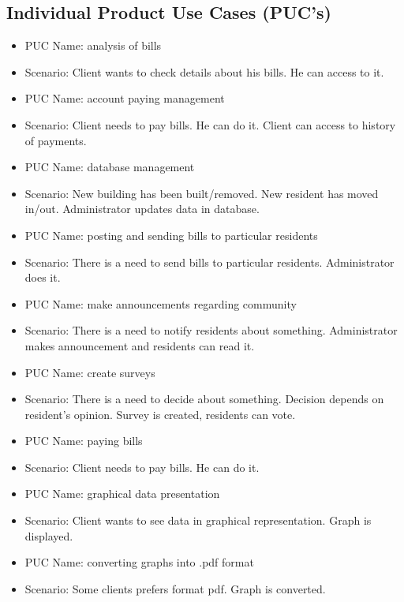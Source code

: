 \documentclass[a4paper,11pt,onecolumn,oneside]{book}
\begin{document}
\subsection{Individual Product Use Cases (PUC’s)}

\begin{itemize}
\item PUC Name: analysis of bills
\item Scenario: Client wants to check details about his bills. He can access to it.


\item PUC Name: account paying management
\item Scenario: Client needs to pay bills. He can do it. Client can access to history of payments.

\item PUC Name: database management
\item Scenario: New building has been built/removed. New resident has moved in/out. Administrator updates data in database.

\item PUC Name: posting and sending bills to particular residents
\item Scenario: There is a need to send bills to particular residents. Administrator does it.

\item PUC Name: make announcements regarding community
\item Scenario: There is a need to notify residents about something. Administrator makes announcement and residents can read it.

\item PUC Name: create surveys
\item Scenario: There is a need to decide about something. Decision depends on resident's opinion. Survey is created, residents can vote.

\item PUC Name: paying bills
\item Scenario: Client needs to pay bills. He can do it.

\item PUC Name: graphical data presentation
\item Scenario: Client wants to see data in graphical representation. Graph is displayed.

\item PUC Name: converting graphs into .pdf format
\item Scenario: Some clients prefers format pdf. Graph is converted.


\end{itemize}
\end{document}
